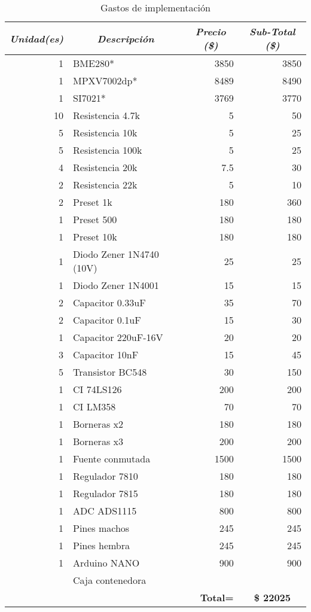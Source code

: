 \begin{table}[H]
	\centering
	\begin{tabular}{|r|l|r|r|}
		\hline
		\multicolumn{1}{|c|}{\textit{\textbf{Unidad(es)}}} & \multicolumn{1}{c|}{\textit{\textbf{Descripción}}} & \multicolumn{1}{c|}{\textit{\textbf{Precio (\$)}}} & \multicolumn{1}{c|}{\textit{\textbf{Sub-Total  (\$)}}} \\ \hline
		1 & BME280* & 3850 & 3850 \\ \hline
		1 & MPXV7002dp* & 8489 & 8490 \\ \hline
		1 & SI7021* & 3769 & 3770 \\ \hline
		10 & Resistencia 4.7k & 5 & 50 \\ \hline
		5 & Resistencia 10k & 5 & 25 \\ \hline
		5 & Resistencia 100k & 5 & 25 \\ \hline
		4 & Resistencia 20k & 7.5 & 30 \\ \hline
		2 & Resistencia 22k & 5 & 10 \\ \hline
		2 & Preset 1k & 180 & 360 \\ \hline
		1 & Preset 500 & 180 & 180 \\ \hline
		1 & Preset 10k & 180 & 180 \\ \hline
		1 & Diodo Zener 1N4740 (10V) & 25 & 25 \\ \hline
		1 & Diodo Zener 1N4001 & 15 & 15 \\ \hline
		2 & Capacitor 0.33uF & 35 & 70 \\ \hline
		2 & Capacitor 0.1uF & 15 & 30 \\ \hline
		1 & Capacitor 220uF-16V & 20 & 20 \\ \hline
		3 & Capacitor 10nF & 15 & 45 \\ \hline
		5 & Transistor BC548 & 30 & 150 \\ \hline
		1 & CI 74LS126 & 200 & 200 \\ \hline
		1 & CI LM358 & 70 & 70 \\ \hline
		1 & Borneras x2 & 180 & 180 \\ \hline
		1 & Borneras x3 & 200 & 200 \\ \hline
		1 & Fuente conmutada & 1500 & 1500 \\ \hline
		1 & Regulador 7810 & 180 & 180 \\ \hline
		1 & Regulador 7815 & 180 & 180 \\ \hline
		1 & ADC ADS1115 & 800 & 800 \\ \hline
		1 & Pines machos & 245 & 245 \\ \hline
		1 & Pines hembra & 245 & 245 \\ \hline
		1 & Arduino NANO & 900 & 900 \\ \hline
		\multicolumn{1}{|l|}{} & Caja contenedora & \multicolumn{1}{l|}{} & \multicolumn{1}{l|}{} \\ \hline
		\multicolumn{3}{|r|}{\textbf{Total=}} & \multicolumn{1}{c|}{\textbf{\$ 22025}} \\ \hline
	\end{tabular}
\caption{Gastos de implementación}
\label{gastos}

\end{table}

